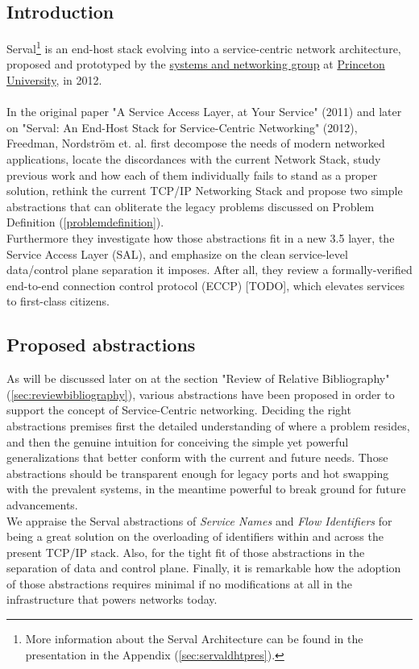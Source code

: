 \subsection{Introduction}
Serval\footnote{More information about the Serval Architecture can be found in the presentation in the Appendix (\ref{sec:servaldhtpres}).} is an end-host stack evolving into a service-centric network architecture, proposed and prototyped by the \href{https://sns.cs.princeton.edu/}{systems and networking group} at \href{https://www.princeton.edu}{Princeton University}, in 2012.

\paragraph{} In the original paper "A Service Access Layer, at Your Service" (2011)\cite{Freedman2011} and later on "Serval: An End-Host Stack for Service-Centric Networking" (2012)\cite{Nordstrom2012}, Freedman, Nordstr{\"o}m et. al. first decompose the needs of modern networked applications, locate the discordances with the current Network Stack, study previous work and how each of them individually fails to stand as a proper solution, rethink the current TCP/IP Networking Stack and propose two simple abstractions that can obliterate the legacy problems discussed on Problem Definition (\ref{problemdefinition}).\\
\indent Furthermore they investigate how those abstractions fit in a new 3.5 layer, the Service Access Layer (SAL), and emphasize on the clean service-level data/control plane separation it imposes. After all, they review a formally-verified end-to-end connection control protocol (ECCP)  [TODO], which elevates services to first-class citizens.

\subsection{Proposed abstractions}
As will be discussed later on at the section "Review of Relative Bibliography" (\ref{sec:reviewbibliography}), various abstractions have been proposed in order to support the concept of Service-Centric networking.
Deciding the right abstractions premises first the detailed understanding of where a problem resides, and then the genuine intuition for conceiving the simple yet powerful generalizations that better conform with the current and future needs.
Those abstractions should be transparent enough for legacy ports and hot swapping with the prevalent systems, in the meantime powerful to break ground for future advancements.\\
\indent We appraise the Serval abstractions of \emph{Service Names} and \emph{Flow Identifiers} for being a great solution on the overloading of identifiers within and across the present TCP/IP stack.
Also, for the tight fit of those abstractions in the separation of data and control plane.
Finally, it is remarkable how the adoption of those abstractions requires minimal if no modifications at all in the infrastructure that powers networks today.

